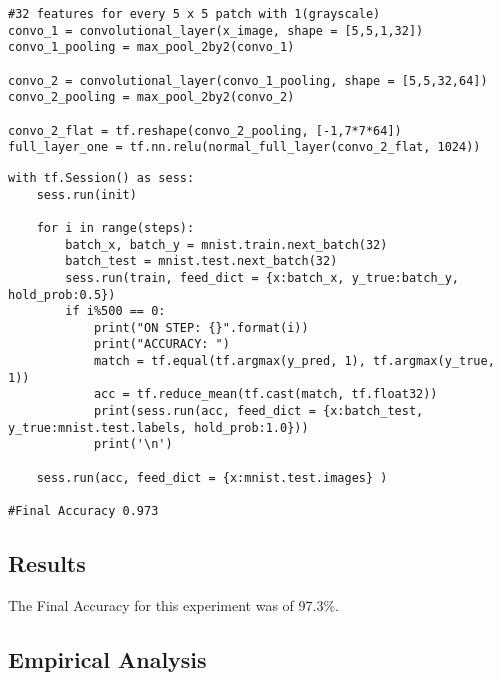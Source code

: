 \begin{lstlisting}
#32 features for every 5 x 5 patch with 1(grayscale)
convo_1 = convolutional_layer(x_image, shape = [5,5,1,32])
convo_1_pooling = max_pool_2by2(convo_1)

convo_2 = convolutional_layer(convo_1_pooling, shape = [5,5,32,64])
convo_2_pooling = max_pool_2by2(convo_2)

convo_2_flat = tf.reshape(convo_2_pooling, [-1,7*7*64])
full_layer_one = tf.nn.relu(normal_full_layer(convo_2_flat, 1024))
\end{lstlisting}

\begin{lstlisting}
with tf.Session() as sess:
    sess.run(init)
    
    for i in range(steps):
        batch_x, batch_y = mnist.train.next_batch(32)
        batch_test = mnist.test.next_batch(32)
        sess.run(train, feed_dict = {x:batch_x, y_true:batch_y, hold_prob:0.5})
        if i%500 == 0:
            print("ON STEP: {}".format(i))
            print("ACCURACY: ")
            match = tf.equal(tf.argmax(y_pred, 1), tf.argmax(y_true, 1))
            acc = tf.reduce_mean(tf.cast(match, tf.float32))
            print(sess.run(acc, feed_dict = {x:batch_test, y_true:mnist.test.labels, hold_prob:1.0}))
            print('\n')
            
    sess.run(acc, feed_dict = {x:mnist.test.images} )

#Final Accuracy 0.973
\end{lstlisting}

\subsection*{Results}
The Final Accuracy for this experiment was of 97.3\%.

\subsection*{Empirical Analysis}
